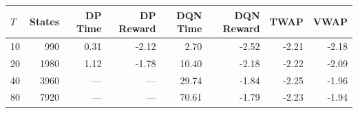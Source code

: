 \begin{tabular}{lrrrrrrr}
\hline
$T$ & States & DP Time & DP Reward & DQN Time & DQN Reward & TWAP & VWAP \\
\hline
10 & 990 & 0.31 & -2.12 & 2.70 & -2.52 & -2.21 & -2.18 \\
20 & 1980 & 1.12 & -1.78 & 10.40 & -2.18 & -2.22 & -2.09 \\
40 & 3960 & --- & --- & 29.74 & -1.84 & -2.25 & -1.96 \\
80 & 7920 & --- & --- & 70.61 & -1.79 & -2.23 & -1.94 \\
\hline
\end{tabular}